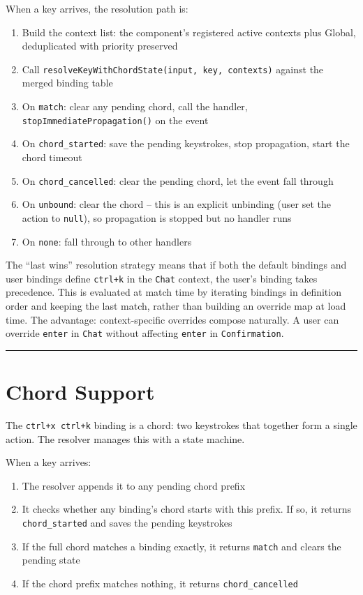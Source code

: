 \documentclass[
  english,
  11pt,
  letterpaper,
]{book}
\providecommand{\tightlist}{%
  \setlength{\itemsep}{0pt}\setlength{\parskip}{0pt}}
\begin{document}
When a key arrives, the resolution path is:

\begin{enumerate}
\def\labelenumi{\arabic{enumi}.}
\tightlist
\item
  Build the context list: the component's registered active contexts
  plus Global, deduplicated with priority preserved
\item
  Call \texttt{resolveKeyWithChordState(input,\ key,\ contexts)} against
  the merged binding table
\item
  On \texttt{match}: clear any pending chord, call the handler,
  \texttt{stopImmediatePropagation()} on the event
\item
  On \texttt{chord\_started}: save the pending keystrokes, stop
  propagation, start the chord timeout
\item
  On \texttt{chord\_cancelled}: clear the pending chord, let the event
  fall through
\item
  On \texttt{unbound}: clear the chord -- this is an explicit unbinding
  (user set the action to \texttt{null}), so propagation is stopped but
  no handler runs
\item
  On \texttt{none}: fall through to other handlers
\end{enumerate}

The ``last wins'' resolution strategy means that if both the default
bindings and user bindings define \texttt{ctrl+k} in the \texttt{Chat}
context, the user's binding takes precedence. This is evaluated at match
time by iterating bindings in definition order and keeping the last
match, rather than building an override map at load time. The advantage:
context-specific overrides compose naturally. A user can override
\texttt{enter} in \texttt{Chat} without affecting \texttt{enter} in
\texttt{Confirmation}.

\begin{center}\rule{0.5\linewidth}{0.5pt}\end{center}

\section{Chord Support}\label{chord-support}

The \texttt{ctrl+x\ ctrl+k} binding is a chord: two keystrokes that
together form a single action. The resolver manages this with a state
machine.

When a key arrives:

\begin{enumerate}
\def\labelenumi{\arabic{enumi}.}
\tightlist
\item
  The resolver appends it to any pending chord prefix
\item
  It checks whether any binding's chord starts with this prefix. If so,
  it returns \texttt{chord\_started} and saves the pending keystrokes
\item
  If the full chord matches a binding exactly, it returns \texttt{match}
  and clears the pending state
\item
  If the chord prefix matches nothing, it returns
  \texttt{chord\_cancelled}
\end{enumerate}
\end{document}
